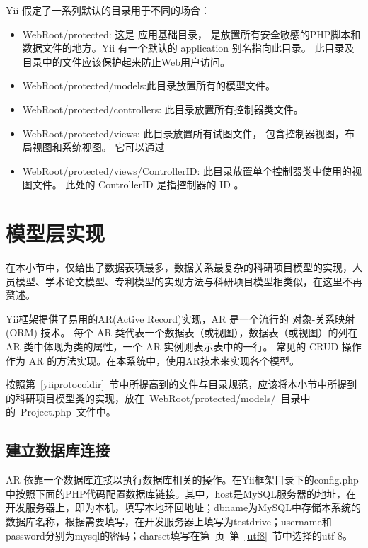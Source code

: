 Yii 假定了一系列默认的目录用于不同的场合：
\begin{itemize}
\item WebRoot/protected: 这是 应用基础目录， 是放置所有安全敏感的PHP脚本和数据文件的地方。Yii 有一个默认的 application 别名指向此目录。 此目录及目录中的文件应该保护起来防止Web用户访问。
\item WebRoot/protected/models:此目录放置所有的模型文件。
\item WebRoot/protected/controllers: 此目录放置所有控制器类文件。
\item WebRoot/protected/views: 此目录放置所有试图文件， 包含控制器视图，布局视图和系统视图。 它可以通过
\item WebRoot/protected/views/ControllerID: 此目录放置单个控制器类中使用的视图文件。 此处的 ControllerID 是指控制器的 ID 。
\end{itemize}

\section{模型层实现}

在本小节中，仅给出了数据表项最多，数据关系最复杂的科研项目模型的实现，人员模型、学术论文模型、专利模型的实现方法与科研项目模型相类似，在这里不再赘述。

Yii框架提供了易用的AR(Active Record)实现，AR 是一个流行的 对象-关系映射 (ORM) 技术。 每个 AR 类代表一个数据表（或视图），数据表（或视图）的列在 AR 类中体现为类的属性，一个 AR 实例则表示表中的一行。 常见的 CRUD 操作作为 AR 的方法实现。在本系统中，使用AR技术来实现各个模型。

按照第~\ref{yiiprotocoldir}~节中所提高到的文件与目录规范，应该将本小节中所提到的科研项目模型类的实现，放在~WebRoot/protected/models/~目录中的~Project.php~文件中。

\subsection{建立数据库连接}

AR 依靠一个数据库连接以执行数据库相关的操作。在Yii框架目录下的config.php中按照下面的PHP代码配置数据库链接。其中，host是MySQL服务器的地址，在开发服务器上，即为本机，填写本地环回地址；dbname为MySQL中存储本系统的数据库名称，根据需要填写，在开发服务器上填写为testdrive；username和password分别为mysql的密码；charset填写在第~\pageref{utf8}页~第~\ref{utf8}~节中选择的utf-8。


